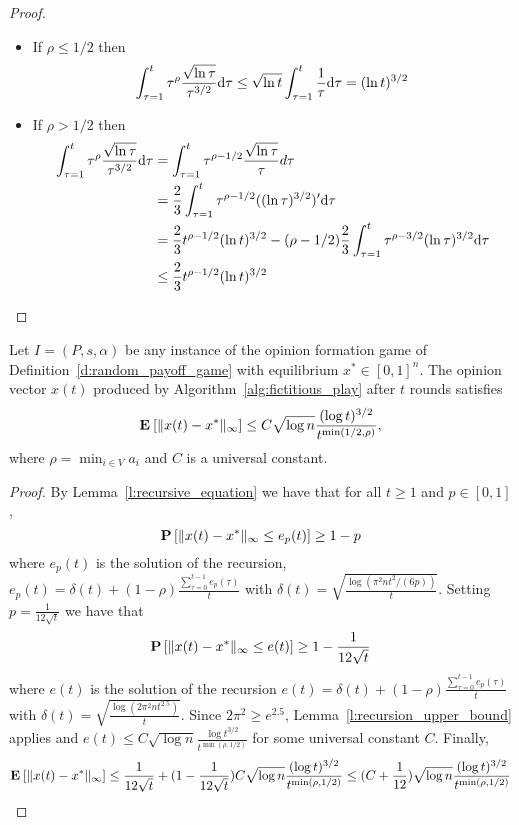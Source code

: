 \begin{proof}
  \begin{itemize}
    \item If
      $\rho\leq 1/2$ then
      \[
        \int_{\tau=1}^t \tau^\rho\frac{\sqrt{\ln \tau}}{\tau^{3/2}}\mathrm{d}\tau
        \leq
        \sqrt{\ln t }
        \int_{\tau=1}^t
        \frac{1}{\tau}\mathrm{d}\tau = (\ln t)^{3/2}
      \]
    \item If $\rho > 1/2$ then\\
      \begin{align*}
        \int_{\tau=1}^t
        \tau^\rho\frac{\sqrt{\ln \tau}}{\tau^{3/2}}\mathrm{d}\tau
        &=
        \int_{\tau=1}^t \tau^{\rho-1/2}\frac{\sqrt{\ln \tau}}{\tau}d\tau \\
        &=
        \frac{2}{3} \int_{\tau=1}^t
        \tau^{\rho-1/2}((\ln \tau)^{3/2})'\mathrm{d}\tau \\
        &=
        \frac{2}{3}t^{\rho - 1/2}(\ln t)^{3/2} - (\rho-1/2)\frac{2}{3}
        \int_{\tau=1}^t \tau^{\rho-3/2}(\ln \tau)^{3/2}\mathrm{d}\tau \\
        &\leq \frac{2}{3} t^{\rho - 1/2}(\ln t)^{3/2}
      \end{align*}
  \end{itemize}
\end{proof}

\begin{theorem}\label{thm:convergence}
  Let $I = (P,s, \alpha)$ be any instance of the opinion formation
  game of Definition~\ref{d:random_payoff_game} with equilibrium
  $x^* \in [0,1]^n$.  The opinion vector $x(t)$ produced by
  Algorithm~\ref{alg:fictitious_play} after $t$ rounds satisfies
  \[
    \bm{\mathrm{E}}_{} \left[ \| x(t) - x^* \|_{\infty} \right] \leq
    C \sqrt{\log n}\frac{(\log t)^{3/2}}{t^{\min(1/2,\rho)}},
  \]
  where $\rho = \min_{i \in V} a_i$ and $C$ is a universal constant.
\end{theorem}

\begin{proof}
By Lemma~\ref{l:recursive_equation} we have that for all $t\geq 1$ and $p \in [0,1]$,
\[\bm{\mathrm{P}}\left[\| x(t)-x^* \|_{\infty} \leq e_p(t)\right] \geq 1-p\]
where $e_p(t)$ is the solution of the recursion, $e_p(t) =\delta(t) + (1-\rho)\frac{\sum_{\tau=0}^{t-1}e_p(\tau)}{t}$ with 
$\delta(t)=\sqrt{ \frac{\log(\pi^2 n t^2/(6 p))}{t}}$. Setting $p=\frac{1}{12\sqrt{t}}$ we have that  
\[\bm{\mathrm{P}}\left[\| x(t)-x^* \|_{\infty} \leq e(t)\right] \geq 1-\frac{1}{12\sqrt{t}}\]
where $e(t)$ is the solution of the recursion $e(t) =\delta(t) + (1-\rho)\frac{\sum_{\tau=0}^{t-1}e_p(\tau)}{t}$ with 
$\delta(t)=\sqrt{\frac{\log(2\pi^2 n t^{2.5})}{t}}$. Since $2\pi^2 \geq e^{2.5}$, Lemma~\ref{l:recursion_upper_bound} applies and 
$e(t)\leq C\sqrt{\log n}\frac{\log t^{3/2}}{t^{\min(\rho,1/2)}}$ for some universal constant $C$. Finally,
\[\bm{\mathrm{E}}_{} \left[ \| x(t) - x^* \|_{\infty} \right] \leq \frac{1}{12\sqrt{t}} + (1-\frac{1}{12\sqrt{t}})C\sqrt{\log n}\frac{(\log t)^{3/2}}{t^{\min(\rho,1/2)}}
\leq (C+\frac{1}{12})\sqrt{\log n}\frac{(\log t)^{3/2}}{t^{\min(\rho,1/2)}}\]
\end{proof}
